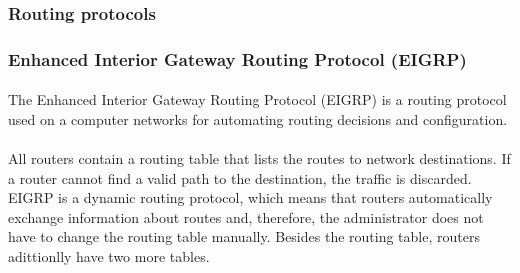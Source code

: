 \subsubsection{Routing protocols}
\subsubsection*{Enhanced Interior Gateway Routing Protocol (EIGRP)\cite{EIGRP}}
\paragraph{}The Enhanced Interior Gateway Routing Protocol (EIGRP) is a routing protocol used on a computer networks for automating routing decisions and configuration.
\paragraph{}All routers contain a routing table that lists the routes to network destinations. If a router cannot find a valid path to the destination, the traffic is discarded. EIGRP is a dynamic routing protocol, which means that routers automatically exchange information about routes and, therefore, the administrator does not have to change the routing table manually. Besides the routing table, routers adittionlly have two more tables.

